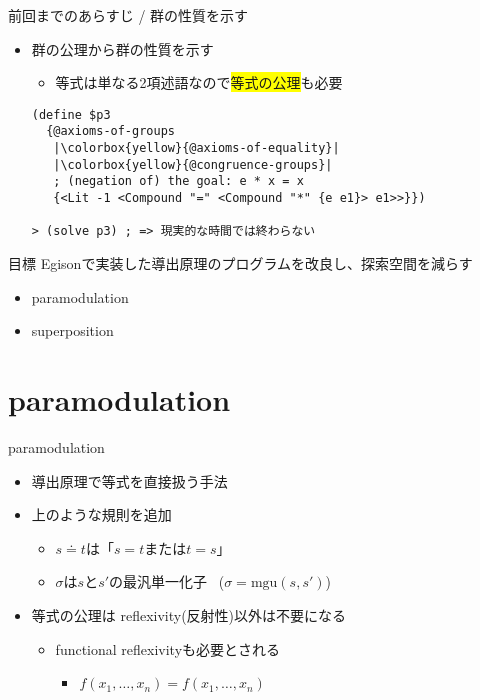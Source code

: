 \documentclass[dvipdfmx,11pt,notheorems]{beamer}
\theoremstyle{definition}
\newcommand{\blue}[1]{{\color{blue} #1}}
\begin{document}
\begin{frame}[fragile]{前回までのあらすじ / 群の性質を示す}
  \begin{itemize}
    \item 群の公理から群の性質を示す
    \begin{itemize}
      \item 等式は単なる2項述語なので\colorbox{yellow}{等式の公理}も必要
    \end{itemize}
    \begin{verbatim}
(define $p3
  {@axioms-of-groups
   |\colorbox{yellow}{@axioms-of-equality}|
   |\colorbox{yellow}{@congruence-groups}|
   ; (negation of) the goal: e * x = x
   {<Lit -1 <Compound "=" <Compound "*" {e e1}> e1>>}})

> (solve p3) ; => 現実的な時間では終わらない
    \end{verbatim}
  \end{itemize}
  \begin{block}{目標}
    Egisonで実装した導出原理のプログラムを改良し、探索空間を減らす
    \begin{itemize}
      \item paramodulation
      \item superposition
    \end{itemize}
  \end{block}
\end{frame}

\section{paramodulation}
\begin{frame}{paramodulation}

  {\Large
  \begin{prooftree}
  \end{prooftree}
  }
  \begin{itemize}
    \item 導出原理で等式を直接扱う手法
    \item 上のような規則を追加
    \begin{itemize}
      \item $s \doteq t$は「$s = t$または$t = s$」
      \item $\sigma$は$s$と$s'$の最汎単一化子 \, ($\sigma = \text{mgu}(s, s')$)
    \end{itemize}

    \item 等式の公理は\blue{reflexivity(反射性)以外は}不要になる
    \begin{itemize}
      \item functional reflexivityも必要とされる
      \begin{itemize}
        \item $f(x_1, \ldots, x_n) = f(x_1, \ldots, x_n)$
      \end{itemize}
    \end{itemize}
  \end{itemize}
\end{frame}
\end{document}
